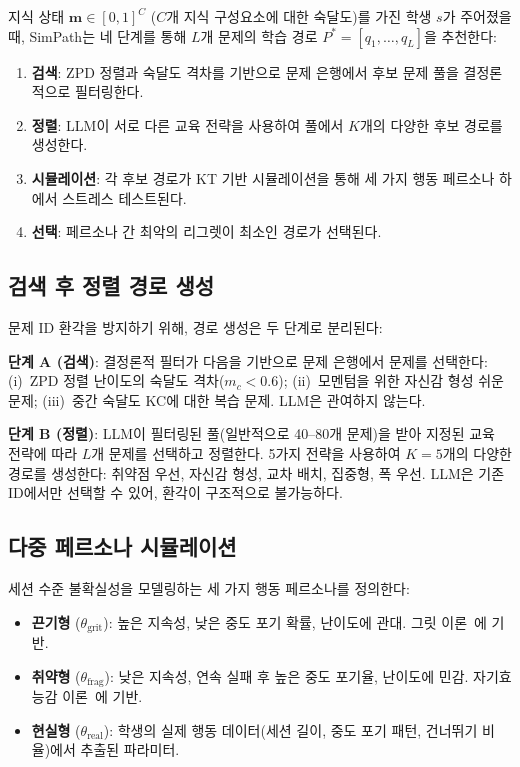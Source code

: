 \documentclass[runningheads]{llncs}
\begin{document}
지식 상태 $\mathbf{m} \in [0,1]^C$ ($C$개 지식 구성요소에 대한 숙달도)를 가진 학생 $s$가 주어졌을 때, SimPath는 네 단계를 통해 $L$개 문제의 학습 경로 $P^* = [q_1, \dots, q_L]$을 추천한다:

\begin{enumerate}
\item \textbf{검색}: ZPD 정렬과 숙달도 격차를 기반으로 문제 은행에서 후보 문제 풀을 결정론적으로 필터링한다.
\item \textbf{정렬}: LLM이 서로 다른 교육 전략을 사용하여 풀에서 $K$개의 다양한 후보 경로를 생성한다.
\item \textbf{시뮬레이션}: 각 후보 경로가 KT 기반 시뮬레이션을 통해 세 가지 행동 페르소나 하에서 스트레스 테스트된다.
\item \textbf{선택}: 페르소나 간 최악의 리그렛이 최소인 경로가 선택된다.
\end{enumerate}

\subsection{검색 후 정렬 경로 생성}

문제 ID 환각을 방지하기 위해, 경로 생성은 두 단계로 분리된다:

\textbf{단계 A (검색)}: 결정론적 필터가 다음을 기반으로 문제 은행에서 문제를 선택한다: (i)~ZPD 정렬 난이도의 숙달도 격차($m_c < 0.6$); (ii)~모멘텀을 위한 자신감 형성 쉬운 문제; (iii)~중간 숙달도 KC에 대한 복습 문제. LLM은 관여하지 않는다.

\textbf{단계 B (정렬)}: LLM이 필터링된 풀(일반적으로 40--80개 문제)을 받아 지정된 교육 전략에 따라 $L$개 문제를 선택하고 정렬한다. 5가지 전략을 사용하여 $K=5$개의 다양한 경로를 생성한다: 취약점 우선, 자신감 형성, 교차 배치, 집중형, 폭 우선. LLM은 기존 ID에서만 선택할 수 있어, 환각이 구조적으로 불가능하다.

\subsection{다중 페르소나 시뮬레이션}

세션 수준 불확실성을 모델링하는 세 가지 행동 페르소나를 정의한다:

\begin{itemize}
\item \textbf{끈기형} ($\theta_{\text{grit}}$): 높은 지속성, 낮은 중도 포기 확률, 난이도에 관대. 그릿 이론~\cite{duckworth2007}에 기반.
\item \textbf{취약형} ($\theta_{\text{frag}}$): 낮은 지속성, 연속 실패 후 높은 중도 포기율, 난이도에 민감. 자기효능감 이론~\cite{bandura1997}에 기반.
\item \textbf{현실형} ($\theta_{\text{real}}$): 학생의 실제 행동 데이터(세션 길이, 중도 포기 패턴, 건너뛰기 비율)에서 추출된 파라미터.
\end{itemize}
\end{document}
